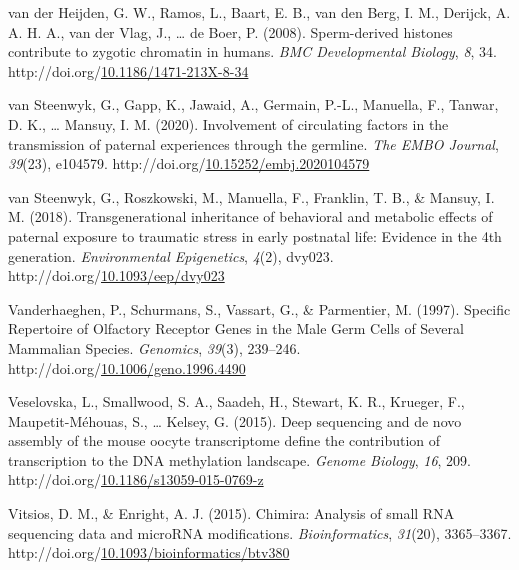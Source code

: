 \documentclass[12pt,twoside]{reedthesis}
\newlength{\cslhangindent}
\newenvironment{CSLReferences}[2] %
 {%
  \setlength{\parindent}{0pt}
  \ifodd #1 \everypar{\setlength{\hangindent}{\cslhangindent}}\ignorespaces\fi
  \ifnum #2 > 0
  \setlength{\parskip}{#2\baselineskip}
  \fi
 }%
 {}
\begin{document}
\begin{CSLReferences}{1}{0}
\leavevmode{}%
van der Heijden, G. W., Ramos, L., Baart, E. B., van den Berg, I. M., Derijck, A. A. H. A., van der Vlag, J., \ldots{} de Boer, P. (2008). Sperm-derived histones contribute to zygotic chromatin in humans. \emph{BMC Developmental Biology}, \emph{8}, 34. http://doi.org/\href{https://doi.org/10.1186/1471-213X-8-34}{10.1186/1471-213X-8-34}

\leavevmode{}%
van Steenwyk, G., Gapp, K., Jawaid, A., Germain, P.-L., Manuella, F., Tanwar, D. K., \ldots{} Mansuy, I. M. (2020). Involvement of circulating factors in the transmission of paternal experiences through the germline. \emph{The EMBO Journal}, \emph{39}(23), e104579. http://doi.org/\href{https://doi.org/10.15252/embj.2020104579}{10.15252/embj.2020104579}

\leavevmode{}%
van Steenwyk, G., Roszkowski, M., Manuella, F., Franklin, T. B., \& Mansuy, I. M. (2018). Transgenerational inheritance of behavioral and metabolic effects of paternal exposure to traumatic stress in early postnatal life: Evidence in the 4th generation. \emph{Environmental Epigenetics}, \emph{4}(2), dvy023. http://doi.org/\href{https://doi.org/10.1093/eep/dvy023}{10.1093/eep/dvy023}

\leavevmode{}%
Vanderhaeghen, P., Schurmans, S., Vassart, G., \& Parmentier, M. (1997). Specific Repertoire of Olfactory Receptor Genes in the Male Germ Cells of Several Mammalian Species. \emph{Genomics}, \emph{39}(3), 239--246. http://doi.org/\href{https://doi.org/10.1006/geno.1996.4490}{10.1006/geno.1996.4490}

\leavevmode{}%
Veselovska, L., Smallwood, S. A., Saadeh, H., Stewart, K. R., Krueger, F., Maupetit-Méhouas, S., \ldots{} Kelsey, G. (2015). Deep sequencing and de novo assembly of the mouse oocyte transcriptome define the contribution of transcription to the DNA methylation landscape. \emph{Genome Biology}, \emph{16}, 209. http://doi.org/\href{https://doi.org/10.1186/s13059-015-0769-z}{10.1186/s13059-015-0769-z}

\leavevmode{}%
Vitsios, D. M., \& Enright, A. J. (2015). Chimira: Analysis of small RNA sequencing data and microRNA modifications. \emph{Bioinformatics}, \emph{31}(20), 3365--3367. http://doi.org/\href{https://doi.org/10.1093/bioinformatics/btv380}{10.1093/bioinformatics/btv380}


\end{CSLReferences}
\end{document}
